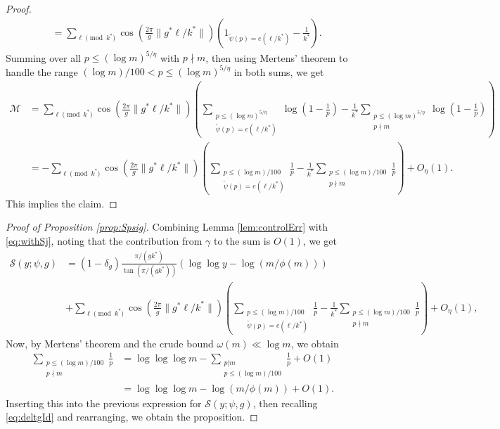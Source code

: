 \documentclass[10pt]{amsart}
\theoremstyle{definition}
\newcommand{\mc}{\mathcal}
\renewcommand{\ss}{\substack}
\begin{document}
\begin{proof}
\begin{align*}
&= \sum_{\ell \pmod{k^\ast}} \cos(\tfrac{2\pi}{g}\|g^\ast \ell /k^\ast\|)\left(1_{\tilde{\psi}(p) = e(\ell/k^\ast)} - \frac{1}{k^\ast}\right).
\end{align*}
Summing over all $p \leq (\log m)^{5/\eta}$ with $p \nmid m$, then using Mertens' theorem to handle the range
$(\log m)/100 < p \leq (\log m)^{5/\eta}$ in both sums, we get
\begin{align*}
\mc{M} &= \sum_{\ell \pmod{k^\ast}} \cos(\tfrac{2\pi}{g}\|g^\ast \ell /k^\ast\|)\left(\sum_{\ss{p \leq (\log m)^{5/\eta} \\ \tilde{\psi}(p) = e(\ell/k^\ast)}} \log\left(1-\frac{1}{p}\right) - \frac{1}{k^\ast} \sum_{\ss{p \leq (\log m)^{5/\eta} \\ p \nmid m}} \log\left(1-\frac{1}{p}\right)\right) \\
&= -\sum_{\ell \pmod{k^\ast}} \cos(\tfrac{2\pi}{g}\|g^\ast \ell /k^\ast\|)\left(\sum_{\ss{p \leq (\log m)/100 \\ \tilde{\psi}(p) = e(\ell/k^\ast)}} \frac{1}{p} - \frac{1}{k^\ast} \sum_{\ss{p \leq (\log m)/100 \\ p \nmid m}} \frac{1}{p} \right) + O_{\eta}(1).
\end{align*}
This implies the claim.
\end{proof}
\begin{proof}[Proof of Proposition \ref{prop:Spsig}]
Combining Lemma \ref{lem:controlErr} with \eqref{eq:withSj}, noting that the contribution from $\gamma$ to the sum is $O(1)$, we get
\begin{align*}
\mc{S}(y;\psi,g) &= (1-\delta_g)\frac{\pi/(gk^\ast)}{\tan(\pi/(gk^\ast))}\left(\log\log y - \log(m/\phi(m))\right) \\
&+\sum_{\ell \pmod{k^\ast}} \cos(\tfrac{2\pi}{g} \|g^\ast \ell/k^\ast\|) \left(\sum_{\ss{p \leq (\log m)/100 \\ \tilde{\psi}(p) = e(\ell/k^\ast)}} \frac{1}{p} - \frac{1}{k^\ast} \sum_{\ss{p \leq (\log m)/100 \\ p \nmid m}} \frac{1}{p} \right) + O_{\eta}(1),
\end{align*}
Now, by Mertens' theorem and the crude bound $\omega(m) \ll \log m$, we obtain
\begin{align}
\sum_{\ss{p \leq (\log m)/100 \\ p \nmid m}} \frac{1}{p} &= \log\log\log m - \sum_{\ss{p|m \\ p \leq (\log m)/100}} \frac{1}{p} + O(1) \nonumber\\
&= \log\log\log m - \log(m/\phi(m)) + O(1). \label{eq:pDivm}
\end{align}
Inserting this into the previous expression for $\mc{S}(y;\psi,g)$, then recalling \eqref{eq:deltgId} and rearranging, we obtain the proposition.
\end{proof}
\end{document}
